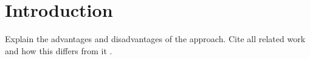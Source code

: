 \section{Introduction}

Explain the advantages and disadvantages of the approach. Cite all related work and how this differs from it \cite{Smith:2024jd} \cite{Smith:2023qr}.
